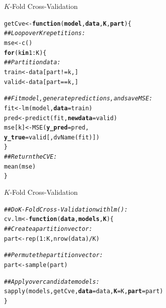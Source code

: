 \documentclass{beamer}\usepackage[]{graphicx}\usepackage[]{color}
\makeatletter
\newcommand{\hlnum}[1]{\textcolor[rgb]{0.69,0.494,0}{#1}}%
\newcommand{\hlcom}[1]{\textcolor[rgb]{0.514,0.506,0.514}{\textit{#1}}}%
\newcommand{\hlopt}[1]{\textcolor[rgb]{0,0,0}{#1}}%
\newcommand{\hlstd}[1]{\textcolor[rgb]{0,0,0}{#1}}%
\newcommand{\hlkwa}[1]{\textcolor[rgb]{0,0,0}{\textbf{#1}}}%
\newcommand{\hlkwb}[1]{\textcolor[rgb]{0,0.341,0.682}{#1}}%
\newcommand{\hlkwc}[1]{\textcolor[rgb]{0,0,0}{\textbf{#1}}}%
\newcommand{\hlkwd}[1]{\textcolor[rgb]{0.004,0.004,0.506}{#1}}%
\newenvironment{kframe}{%
 \def\at@end@of@kframe{}%
 \ifinner\ifhmode%
  \def\at@end@of@kframe{\end{minipage}}%
  \begin{minipage}{\columnwidth}%
 \fi\fi%
 \def\FrameCommand##1{\hskip\@totalleftmargin \hskip-\fboxsep
 \colorbox{shadecolor}{##1}\hskip-\fboxsep
     \hskip-\linewidth \hskip-\@totalleftmargin \hskip\columnwidth}%
 \MakeFramed {\advance\hsize-\width
   \@totalleftmargin\z@ \linewidth\hsize
   \@setminipage}}%
 {\par\unskip\endMakeFramed%
 \at@end@of@kframe}
\newenvironment{knitrout}{}{} %
\makeatother
\begin{document}
\watermarkoff %

\begin{frame}[fragile]{$K$-Fold Cross-Validation}

\begin{knitrout}\footnotesize
{}\color{fgcolor}\begin{kframe}
\begin{alltt}
\hlstd{getCve} \hlkwb{<-} \hlkwa{function}\hlstd{(}\hlkwc{model}\hlstd{,} \hlkwc{data}\hlstd{,} \hlkwc{K}\hlstd{,} \hlkwc{part}\hlstd{) \{}
    \hlcom{## Loop over K repetitions:}
    \hlstd{mse} \hlkwb{<-} \hlkwd{c}\hlstd{()}
    \hlkwa{for}\hlstd{(k} \hlkwa{in} \hlnum{1} \hlopt{:} \hlstd{K) \{}
        \hlcom{## Partition data:}
        \hlstd{train} \hlkwb{<-} \hlstd{data[part} \hlopt{!=} \hlstd{k, ]}
        \hlstd{valid} \hlkwb{<-} \hlstd{data[part} \hlopt{==} \hlstd{k, ]}

        \hlcom{## Fit model, generate predictions, and save MSE:}
        \hlstd{fit}    \hlkwb{<-} \hlkwd{lm}\hlstd{(model,} \hlkwc{data} \hlstd{= train)}
        \hlstd{pred}   \hlkwb{<-} \hlkwd{predict}\hlstd{(fit,} \hlkwc{newdata} \hlstd{= valid)}
        \hlstd{mse[k]} \hlkwb{<-} \hlkwd{MSE}\hlstd{(}\hlkwc{y_pred} \hlstd{= pred,}
                      \hlkwc{y_true} \hlstd{= valid[ ,} \hlkwd{dvName}\hlstd{(fit)])}
    \hlstd{\}}
    \hlcom{## Return the CVE:}
    \hlkwd{mean}\hlstd{(mse)}
\hlstd{\}}
\end{alltt}
\end{kframe}
\end{knitrout}

\end{frame}


\begin{frame}[fragile]{$K$-Fold Cross-Validation}

\begin{knitrout}\footnotesize
{}\color{fgcolor}\begin{kframe}
\begin{alltt}
\hlcom{## Do K-Fold Cross-Validation with lm():}
\hlstd{cv.lm} \hlkwb{<-} \hlkwa{function}\hlstd{(}\hlkwc{data}\hlstd{,} \hlkwc{models}\hlstd{,} \hlkwc{K}\hlstd{) \{}
    \hlcom{## Create a partition vector:}
    \hlstd{part} \hlkwb{<-} \hlkwd{rep}\hlstd{(}\hlnum{1} \hlopt{:} \hlstd{K,} \hlkwd{nrow}\hlstd{(data)} \hlopt{/} \hlstd{K)}

    \hlcom{## Permute the partition vector:}
    \hlstd{part} \hlkwb{<-} \hlkwd{sample}\hlstd{(part)}

    \hlcom{## Apply over candidate models:}
    \hlkwd{sapply}\hlstd{(models, getCve,} \hlkwc{data} \hlstd{= data,} \hlkwc{K} \hlstd{= K,} \hlkwc{part} \hlstd{= part)}
\hlstd{\}}
\end{alltt}
\end{kframe}
\end{knitrout}

\end{frame}
\end{document}
